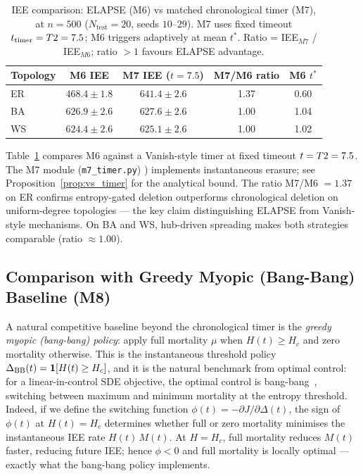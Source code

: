 \documentclass[review,12pt]{elsarticle}
\newcommand{\Hc}{H_c}
\begin{document}
\begin{table}[htbp]
  \caption{IEE comparison: ELAPSE (M6) vs matched chronological timer (M7),
           at $n=500$ ($N_{\mathrm{test}}=20$, seeds $10$--$29$).
           M7 uses fixed timeout $t_{\mathrm{timer}}=T\/2=7.5$; M6 triggers adaptively at mean $t^*$.
           Ratio = IEE$_{M7}$ / IEE$_{M6}$; ratio $>1$ favours ELAPSE
           advantage.}
  \label{tab:m7}
  \centering
  \small
  \renewcommand{\arraystretch}{1.2}
  \begin{tabular}{lcccc}
    \toprule
    Topology & M6 IEE & M7 IEE ($t{=}7.5$) & M7/M6 ratio & M6 $t^*$ \\
    \midrule
    ER & $468.4\pm 1.8$ & $641.4\pm 2.6$ & 1.37 & 0.60 \\
    BA & $626.9\pm 2.6$ & $627.6\pm 2.6$ & 1.00 & 1.04 \\
    WS & $624.4\pm 2.6$ & $625.1\pm 2.6$ & 1.00 & 1.02 \\
    \bottomrule
  \end{tabular}
\end{table}

\noindent
Table~\ref{tab:m7} compares M6 against a Vanish-style timer at fixed timeout $t=T\/2=7.5$. The M7 module (\texttt{m7\_timer.py})
) implements instantaneous erasure; see Proposition~\ref{prop:vs_timer} for the analytical bound. The
ratio M7/M6 $= 1.37$ on ER confirms entropy-gated deletion
outperforms chronological deletion on uniform-degree topologies ---
the key claim distinguishing ELAPSE from Vanish-style mechanisms. On BA and WS, hub-driven spreading makes both strategies comparable (ratio $\approx 1.00$).

\subsection{Comparison with Greedy Myopic (Bang-Bang) Baseline (M8)}
\label{sec:greedy}

A natural competitive baseline beyond the chronological timer is the
\emph{greedy myopic (bang-bang) policy}: apply full mortality $\mu$ when
$H(t) \geq \Hc$ and zero mortality otherwise.  This is the instantaneous
threshold policy $\Delta_{\rm BB}(t) = \mathbf{1}[H(t) \geq \Hc]$, and
it is the natural benchmark from optimal control: for a linear-in-control
SDE objective, the optimal control is bang-bang~\cite{oksendal2003stochastic},
switching between maximum and minimum mortality at the entropy threshold.
Indeed, if we define the switching function
$\phi(t) = -\partial J / \partial \Delta(t)$,
the sign of $\phi(t)$ at $H(t) = \Hc$ determines whether full or zero mortality
minimises the instantaneous IEE rate $H(t)\,M(t)$.  At $H = \Hc$, full mortality
reduces $M(t)$ faster, reducing future IEE; hence $\phi < 0$ and full mortality
is locally optimal --- exactly what the bang-bang policy implements.
\end{document}
